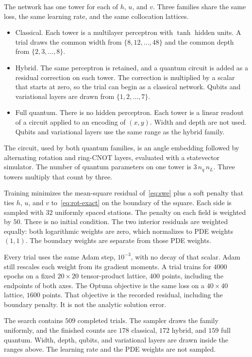 \documentclass[11pt]{article}
\begin{document}
The network has one tower for each of \(h\), \(u\), and \(v\). Three families share the same loss, the same learning rate, and the same collocation lattices.

\begin{itemize}
\item Classical. Each tower is a multilayer perceptron with \(\tanh\) hidden units. A trial draws the common width from \(\{8,12,\ldots,48\}\) and the common depth from \(\{2,3,\ldots,8\}\).
\item Hybrid. The same perceptron is retained, and a quantum circuit is added as a residual correction on each tower. The correction is multiplied by a scalar that starts at zero, so the trial can begin as a classical network. Qubits and variational layers are drawn from \(\{1,2,\ldots,7\}\).
\item Full quantum. There is no hidden perceptron. Each tower is a linear readout of a circuit applied to an encoding of \((x,y)\). Width and depth are not used. Qubits and variational layers use the same range as the hybrid family.
\end{itemize}

The circuit, used by both quantum families, is an angle embedding followed by alternating rotation and ring-CNOT layers, evaluated with a statevector simulator. The number of quantum parameters on one tower is \(3\,n_{q}\,n_{L}\). Three towers multiply that count by three.

Training minimizes the mean-square residual of~\eqref{eq:swe} plus a soft penalty that ties \(h\), \(u\), and \(v\) to~\eqref{eq:rot-exact} on the boundary of the square. Each side is sampled with \(32\) uniformly spaced stations. The penalty on each field is weighted by \(50\). There is no initial condition. The two interior residuals are weighted equally: both logarithmic weights are zero, which normalizes to PDE weights \((1,1)\). The boundary weights are separate from those PDE weights.

Every trial uses the same Adam step, \(10^{-3}\), with no decay of that scalar. Adam still rescales each weight from its gradient moments. A trial trains for \(4000\) epochs on a fixed \(20\times 20\) tensor-product lattice, \(400\) points, including the endpoints of both axes. The Optuna objective is the same loss on a \(40\times 40\) lattice, \(1600\) points. That objective is the recorded residual, including the boundary penalty. It is not the analytic solution error.

The search contains \(509\) completed trials. The sampler draws the family uniformly, and the finished counts are \(178\) classical, \(172\) hybrid, and \(159\) full quantum. Width, depth, qubits, and variational layers are drawn inside the ranges above. The learning rate and the PDE weights are not sampled.
\end{document}
